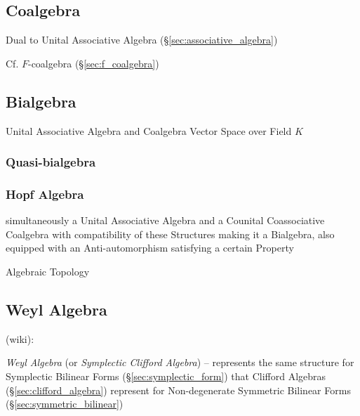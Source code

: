 \subsection{Coalgebra}\label{sec:coalgebra}

Dual to Unital Associative Algebra (\S\ref{sec:associative_algebra})

Cf. $F$-coalgebra (\S\ref{sec:f_coalgebra})



\subsection{Bialgebra}\label{sec:bialgebra}

Unital Associative Algebra and Coalgebra Vector Space over Field $K$



\subsubsection{Quasi-bialgebra}\label{sec:quasi_bialgebra}

\subsubsection{Hopf Algebra}\label{sec:hopf_algebra}

simultaneously a Unital Associative Algebra and a Counital
Coassociative Coalgebra with compatibility of these Structures making
it a Bialgebra, also equipped with an Anti-automorphism satisfying a
certain Property %

Algebraic Topology



\subsection{Weyl Algebra}\label{sec:weyl_algebra}

(wiki):

\emph{Weyl Algebra} (or \emph{Symplectic Clifford Algebra}) -- represents the
same structure for Symplectic Bilinear Forms (\S\ref{sec:symplectic_form}) that
Clifford Algebras (\S\ref{sec:clifford_algebra}) represent for Non-degenerate
Symmetric Bilinear Forms (\S\ref{sec:symmetric_bilinear})

